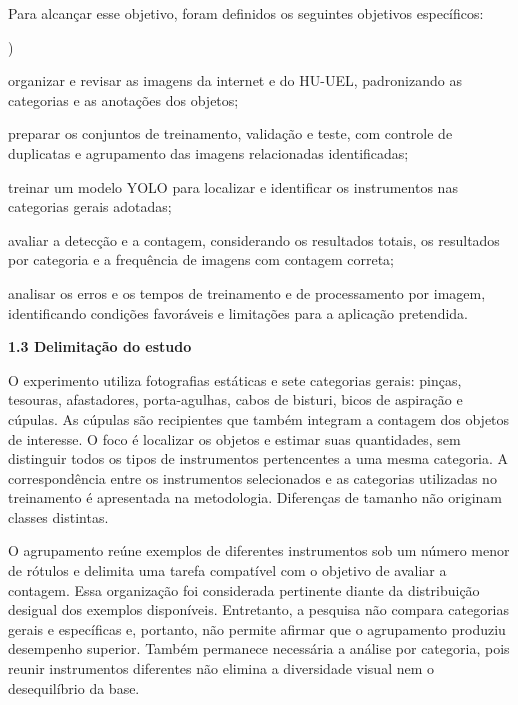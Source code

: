 Para alcançar esse objetivo, foram definidos os seguintes objetivos específicos:
\begin{list}{)}{\setlength{\leftmargin}{1.25cm}\setlength{\labelsep}{0.5em}\setlength{\itemsep}{0pt}\setlength{\parsep}{0pt}\setlength{\topsep}{0pt}}
\item organizar e revisar as imagens da internet e do HU-UEL, padronizando as categorias e as anotações dos objetos;
\item preparar os conjuntos de treinamento, validação e teste, com controle de duplicatas e agrupamento das imagens relacionadas identificadas;
\item treinar um modelo YOLO para localizar e identificar os instrumentos nas categorias gerais adotadas;
\item avaliar a detecção e a contagem, considerando os resultados totais, os resultados por categoria e a frequência de imagens com contagem correta;
\item analisar os erros e os tempos de treinamento e de processamento por imagem, identificando condições favoráveis e limitações para a aplicação pretendida.
\end{list}

\vspace{\baselineskip}
{}
\noindent\textbf{1.3 Delimitação do estudo}\par
\vspace{\baselineskip}

O experimento utiliza fotografias estáticas e sete categorias gerais: pinças, tesouras, afastadores, porta-agulhas, cabos de bisturi, bicos de aspiração e cúpulas. As cúpulas são recipientes que também integram a contagem dos objetos de interesse. O foco é localizar os objetos e estimar suas quantidades, sem distinguir todos os tipos de instrumentos pertencentes a uma mesma categoria. A correspondência entre os instrumentos selecionados e as categorias utilizadas no treinamento é apresentada na metodologia. Diferenças de tamanho não originam classes distintas.

O agrupamento reúne exemplos de diferentes instrumentos sob um número menor de rótulos e delimita uma tarefa compatível com o objetivo de avaliar a contagem. Essa organização foi considerada pertinente diante da distribuição desigual dos exemplos disponíveis. Entretanto, a pesquisa não compara categorias gerais e específicas e, portanto, não permite afirmar que o agrupamento produziu desempenho superior. Também permanece necessária a análise por categoria, pois reunir instrumentos diferentes não elimina a diversidade visual nem o desequilíbrio da base.

